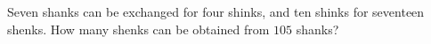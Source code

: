 Seven shanks can be exchanged for four shinks, and ten shinks for seventeen shenks. How many shenks can be obtained from $105$ shanks?
